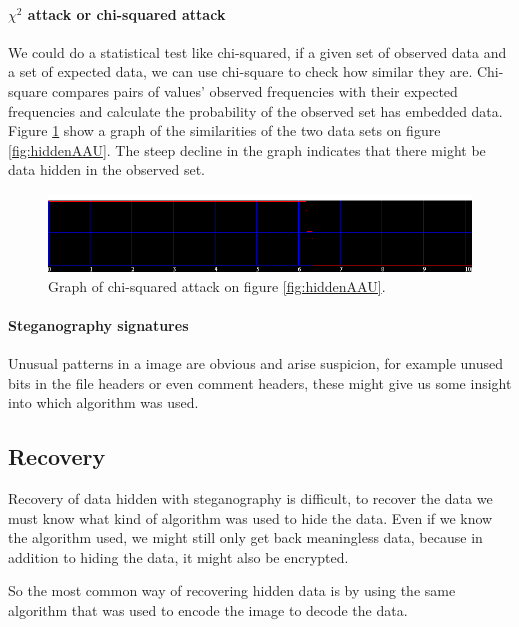 \paragraph*{$\chi^2$ attack or chi-squared attack}
We could do a statistical test like chi-squared, if a given set of observed data and a set of expected data, we can use chi-square to check how similar they are.
Chi-square compares pairs of values' observed frequencies with their expected frequencies and calculate the probability of the observed set has embedded data.
Figure \ref{fig:Chiattack} show a graph of the similarities of the two data sets on figure \ref{fig:hiddenAAU}.
The steep decline in the graph indicates that there might be data hidden in the observed set.\citep{Westfeld2000}

\begin{figure}
	\centering
	\includegraphics[width=1\textwidth]{figures/ChisquareAAU.png}
	\caption{Graph of chi-squared attack on figure \ref{fig:hiddenAAU}.}
	\label{fig:Chiattack}
\end{figure}

\paragraph*{Steganography signatures}
Unusual patterns in a image are obvious and arise suspicion, for example unused bits in the file headers or even comment headers, these might give us some insight into which algorithm was used.

\subsection{Recovery}
Recovery of data hidden with steganography is difficult, to recover the data we must know what kind of algorithm was used to hide the data.
Even if we know the algorithm used, we might still only get back meaningless data, because in addition to hiding the data, it might also be encrypted.

So the most common way of recovering hidden data is by using the same algorithm that was used to encode the image to decode the data.
